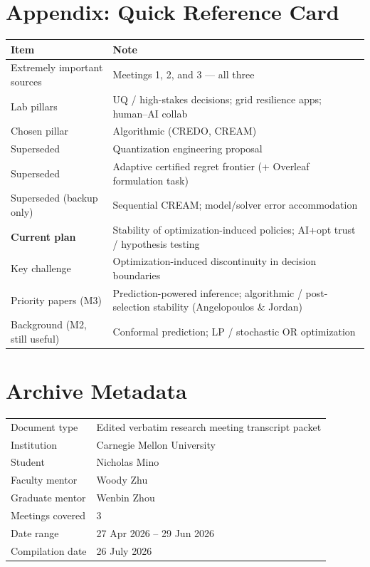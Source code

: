 \documentclass[11pt]{article}
\begin{document}
\section*{Appendix: Quick Reference Card}
\begin{center}
\begin{tabularx}{\linewidth}{@{}l >{\RaggedRight\arraybackslash}X@{}}
\toprule
\textbf{Item} & \textbf{Note} \\
\midrule
Extremely important sources & Meetings 1, 2, and 3 --- all three \\
Lab pillars & UQ / high-stakes decisions; grid resilience apps; human--AI collab \\
Chosen pillar & Algorithmic (CREDO, CREAM) \\
Superseded & Quantization engineering proposal \\
Superseded & Adaptive certified regret frontier (+ Overleaf formulation task) \\
Superseded (backup only) & Sequential CREAM; model/solver error accommodation \\
\textbf{Current plan} & Stability of optimization-induced policies; AI+opt trust /
  hypothesis testing \\
Key challenge & Optimization-induced discontinuity in decision boundaries \\
Priority papers (M3) & Prediction-powered inference; algorithmic / post-selection
  stability (Angelopoulos \& Jordan) \\
Background (M2, still useful) & Conformal prediction; LP / stochastic OR optimization \\
\bottomrule
\end{tabularx}
\end{center}

\section*{Archive Metadata}
\begin{tabular}{@{}ll@{}}
Document type & Edited verbatim research meeting transcript packet \\
Institution & Carnegie Mellon University \\
Student & Nicholas Mino \\
Faculty mentor & Woody Zhu \\
Graduate mentor & Wenbin Zhou \\
Meetings covered & 3 \\
Date range & 27 Apr 2026 -- 29 Jun 2026 \\
Compilation date & 26 July 2026 \\
\end{tabular}
\end{document}
